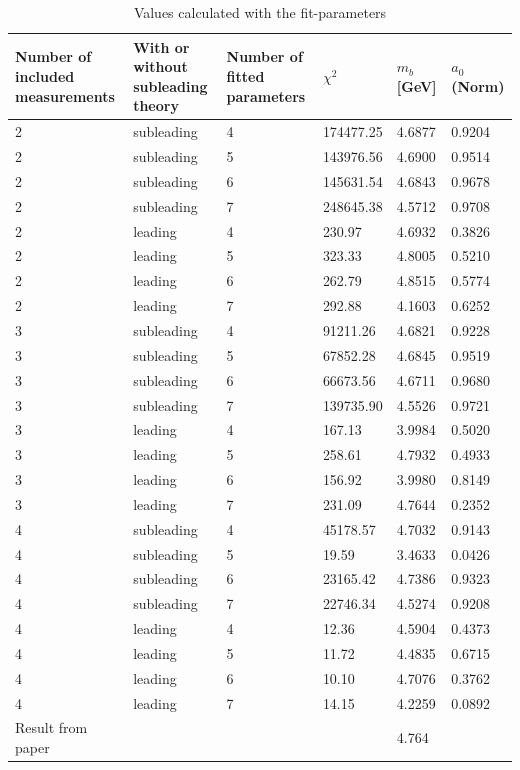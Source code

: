 \documentclass[a4paper,12pt]{article}
\begin{document}
\begin{table}[H]
    \begin{tabular}{|p{3.5cm}|p{3.5cm}|p{3.5cm}|l|l|l|}
        \hline
        Number of included measurements & With or without subleading theory & Number of fitted parameters & $\chi^2$ & $m_b$ [\unit{GeV}] & $a_0$ (Norm) \\
        \hline
        2&subleading&4&174477.25&4.6877&0.9204\\
        2&subleading&5&143976.56&4.6900&0.9514\\
        2&subleading&6&145631.54&4.6843&0.9678\\
        2&subleading&7&248645.38&4.5712&0.9708\\
        2&leading&4&230.97&4.6932&0.3826\\
        2&leading&5&323.33&4.8005&0.5210\\
        2&leading&6&262.79&4.8515&0.5774\\
        2&leading&7&292.88&4.1603&0.6252\\
        3&subleading&4&91211.26&4.6821&0.9228\\
        3&subleading&5&67852.28&4.6845&0.9519\\
        3&subleading&6&66673.56&4.6711&0.9680\\
        3&subleading&7&139735.90&4.5526&0.9721\\
        3&leading&4&167.13&3.9984&0.5020\\
        3&leading&5&258.61&4.7932&0.4933\\
        3&leading&6&156.92&3.9980&0.8149\\
        3&leading&7&231.09&4.7644&0.2352\\
        4&subleading&4&45178.57&4.7032&0.9143\\
        4&subleading&5&19.59&3.4633&0.0426\\
        4&subleading&6&23165.42&4.7386&0.9323\\
        4&subleading&7&22746.34&4.5274&0.9208\\
        4&leading&4&12.36&4.5904&0.4373\\
        4&leading&5&11.72&4.4835&0.6715\\
        \rowcolor{green!20} %
        4&leading&6&10.10&4.7076&0.3762\\
        4&leading&7&14.15&4.2259&0.0892\\
        \hline
        \hline
        Result from paper&&&&4.764&\\
        \hline 
    \end{tabular}
    \caption{Values calculated with the fit-parameters}
\end{table}
\end{document}
